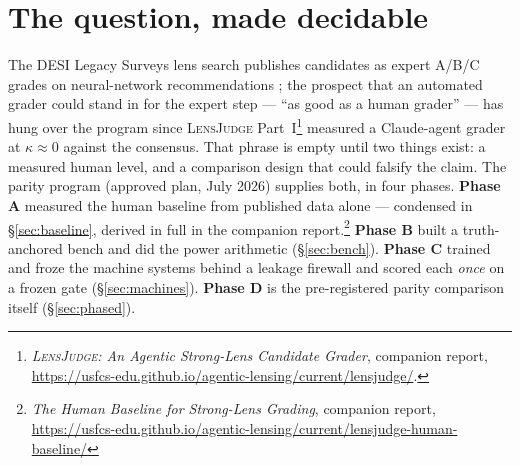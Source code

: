 \documentclass[11pt,letterpaper]{article}
\newcommand{\lj}{\textsc{LensJudge}}
\newcommand{\qwk}{\ensuremath{\kappa_{\mathrm{qw}}}}
\newcommand{\dauc}{\ensuremath{\Delta\mathrm{AUC}}}
\begin{document}
\begin{abstract}
$+0.11$/$+0.24$ training delta over its zero-shot control --- where v4-style Claude
distillation had failed; and giving a Claude grader the human graders' own information
set produced the program's first statistically significant tier-1 lever
($\dauc=+0.151$ $[+0.020,+0.280]$ over the deployed grader), whose \emph{absolute} level
on the hard contrast then failed to replicate at the gate ($0.487$) --- the
disjoint-draw discipline doing exactly its job. The pre-registered Phase D comparison (paired stratified bootstrap $\dauc$ against the
human grade, DeLong test, non-inferiority margin $\delta_0=0.05$; agreement \qwk{}; an
Euclid-field context arm) then delivers the program's answer: on the $130$
truth-decided candidates, \textbf{both the student ($\mathrm{AUC}=0.685$,
$\dauc=+0.108$ $[-0.028,+0.241]$) and the frozen CNN ($\dauc=+0.182$
$[-0.011,+0.425]$) are formally non-inferior to the expert grade} --- with point
estimates that \emph{favor} the machines, though superiority is not established
(DeLong $p\!\approx\!0.13$) and only eight refuted negatives carry the comparison. The
machines do not reproduce the letter grade itself (\qwk{} $0.044$), and the student's
truth signal does not transfer to the harder Euclid-selected case mix ($0.509$). The
defensible deployment today is therefore score-based vetting through calibrated
operating points --- the letter grades stay human.
\end{abstract}

\section{The question, made decidable}\label{sec:question}
The DESI Legacy Surveys lens search publishes candidates as expert A/B/C grades on
neural-network recommendations \citep{huang2020decals,huang2021desi,storfer2024dr9,
inchausti2025}; the prospect that an automated grader could stand in for the expert
step --- ``as good as a human grader'' --- has hung over the program since \lj{}
Part~I\footnote{\emph{\lj{}: An Agentic Strong-Lens Candidate Grader}, companion
report, \url{https://usfcs-edu.github.io/agentic-lensing/current/lensjudge/}.} measured
a Claude-agent grader at $\kappa\approx0$ against the consensus. That phrase is empty
until two things exist: a measured human level, and a comparison design that could
falsify the claim. The parity program (approved plan, July 2026) supplies both, in four
phases. \textbf{Phase A} measured the human baseline from published data alone ---
condensed in \S\ref{sec:baseline}, derived in full in the companion
report.\footnote{\emph{The Human Baseline for Strong-Lens Grading}, companion report,
\url{https://usfcs-edu.github.io/agentic-lensing/current/lensjudge-human-baseline/}\label{fn:baseline}}
\textbf{Phase B} built a truth-anchored bench and did the power arithmetic
(\S\ref{sec:bench}). \textbf{Phase C} trained and froze the machine systems behind a
leakage firewall and scored each \emph{once} on a frozen gate (\S\ref{sec:machines}).
\textbf{Phase D} is the pre-registered parity comparison itself (\S\ref{sec:phased}).
\end{document}
